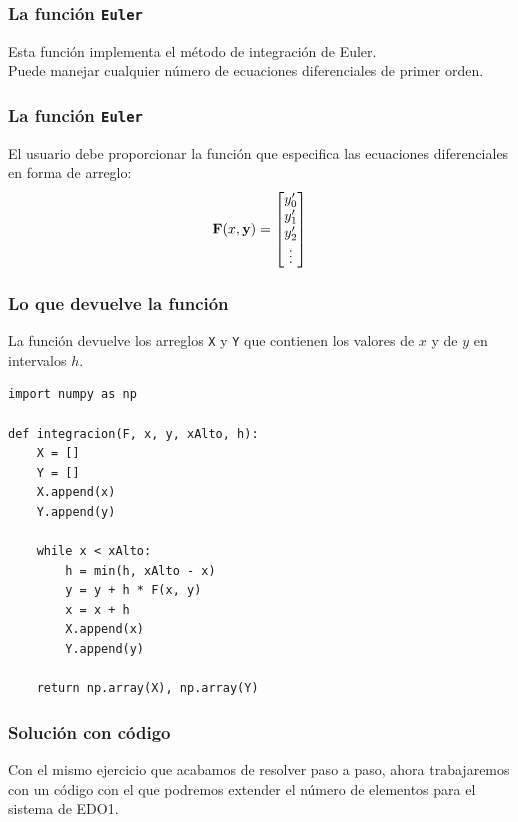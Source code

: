 \documentclass[12pt]{beamer}
\begin{document}
\begin{frame}
\frametitle{La función \texttt{Euler}}
Esta función implementa el \textcolor{ao}{método de integración de Euler}.
\\
\bigskip
\pause
Puede manejar cualquier número de ecuaciones diferenciales de primer orden.
\end{frame}
\begin{frame}
\frametitle{La función \texttt{Euler}}
El usuario debe proporcionar la función  que especifica las ecuaciones diferenciales en forma de arreglo:
\pause
\renewcommand*{\arraystretch}{0.7}
\begin{align*}
\mathbf{F} (x, \mathbf{y}) = 
\begin{bmatrix}
{y}^{\prime}_{0} \\
{y}^{\prime}_{1} \\
{y}^{\prime}_{2} \\
\vdots
\end{bmatrix}
\end{align*}
\end{frame}
\begin{frame}
\frametitle{Lo que devuelve la función}
La función devuelve los arreglos \texttt{X} y \texttt{Y} que contienen los valores de $x$ y de $y$ en intervalos $h$.
\end{frame}
\begin{frame}
\begin{lstlisting}[caption=Método de Euler]
import numpy as np

def integracion(F, x, y, xAlto, h):
    X = []
    Y = []
    X.append(x)
    Y.append(y)

    while x < xAlto:
        h = min(h, xAlto - x)
        y = y + h * F(x, y)
        x = x + h
        X.append(x)
        Y.append(y)

    return np.array(X), np.array(Y)
\end{lstlisting}
\end{frame}
\begin{frame}
\frametitle{Solución con código}
Con el mismo ejercicio que acabamos de resolver paso a paso, ahora trabajaremos con un código con el que podremos extender el número de elementos para el sistema de EDO1.
\end{frame}
\end{document}

